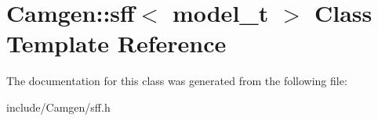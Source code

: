 \hypertarget{a00491}{\section{Camgen\-:\-:sff$<$ model\-\_\-t $>$ Class Template Reference}
\label{a00491}
}


The documentation for this class was generated from the following file\-:\begin{DoxyCompactItemize}
\item 
include/\-Camgen/sff.\-h\end{DoxyCompactItemize}
